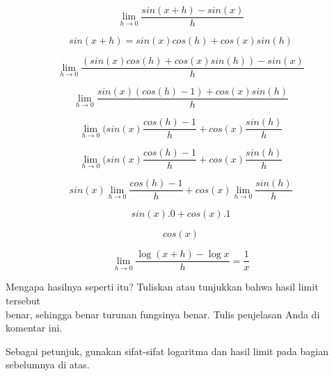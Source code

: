 \documentclass{article}
\begin{document}
\begin{eulernotebook}
\begin{eulercomment}
\begin{eulercomment}
\begin{eulercomment}
\begin{eulercomment}
\begin{eulercomment}
\end{eulercomment}
\begin{eulerformula}
\[
\lim \limits_{h \to 0} \frac{sin(x+h)-sin(x)}{h}
\]
\end{eulerformula}
\begin{eulerformula}
\[
sin(x+h)=sin(x)cos(h)+cos(x)sin(h)
\]
\end{eulerformula}
\begin{eulerformula}
\[
\lim \limits_{h \to 0} \frac{(sin(x)cos(h)+cos(x)sin(h))-sin(x)}{h}
\]
\end{eulerformula}
\begin{eulerformula}
\[
\lim \limits_{h \to 0} \frac{sin(x)(cos(h)-1)+cos(x)sin(h)}{h}
\]
\end{eulerformula}
\begin{eulerformula}
\[
\lim \limits_{h \to 0} (sin(x)\frac{cos(h)-1}{h}+cos(x)\frac{sin(h)}{h}
\]
\end{eulerformula}
\begin{eulerformula}
\[
\lim \limits_{h \to 0} (sin(x)\frac{cos(h)-1}{h}+cos(x)\frac{sin(h)}{h}
\]
\end{eulerformula}
\begin{eulerformula}
\[
sin(x)\lim \limits_{h \to 0} \frac{cos(h)-1}{h}+cos(x)\lim \limits_{h \to 0} \frac{sin(h)}{h}
\]
\end{eulerformula}
\begin{eulerformula}
\[
sin(x). 0 + cos(x). 1
\]
\end{eulerformula}
\begin{eulerformula}
\[
cos(x)
\]
\end{eulerformula}
\begin{eulerformula}
\[
\lim_{h\rightarrow 0}{\frac{\log \left(x+h\right)-\log x}{h}}=  \frac{1}{x}
\]
\end{eulerformula}
\begin{eulercomment}
Mengapa hasilnya seperti itu? Tuliskan atau tunjukkan bahwa hasil
limit tersebut\\
benar, sehingga benar turunan fungsinya benar.  Tulis penjelasan Anda
di komentar ini.

Sebagai petunjuk, gunakan sifat-sifat logaritma dan hasil limit pada
bagian sebelumnya di atas.


\end{eulercomment}
\end{eulercomment}
\end{eulercomment}
\end{eulercomment}
\end{eulercomment}
\end{eulernotebook}
\end{document}
